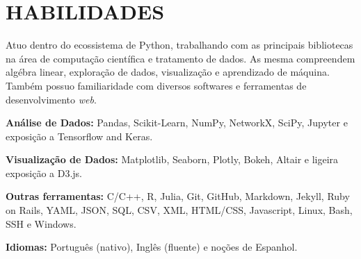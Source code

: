 \documentclass[12pt,a4paper,roman]{moderncv}        %
\begin{document}

\section{HABILIDADES}

\vspace{6pt}
Atuo dentro do ecossistema de Python, trabalhando com as principais bibliotecas na área de computação científica e tratamento de dados. As mesma compreendem algébra linear, exploração de dados, visualização e aprendizado de máquina. Também possuo familiaridade com diversos softwares e ferramentas de desenvolvimento \textit{web}.
\vspace{6pt}

\textbf{Análise de Dados:} Pandas, Scikit-Learn, NumPy, NetworkX, SciPy, Jupyter e exposição a Tensorflow and Keras.

\vspace{6pt}

 \textbf{Visualização de Dados:} Matplotlib, Seaborn, Plotly, Bokeh, Altair e ligeira exposição a D3.js.

\vspace{6pt}

\textbf{Outras ferramentas:} C/C++, R, Julia, Git, GitHub, Markdown, Jekyll, Ruby on Rails, YAML, JSON, SQL, CSV, XML, HTML/CSS,  Javascript, Linux, Bash, SSH e Windows.

\vspace{6pt}

\textbf{Idiomas:} Português (nativo), Inglês (fluente) e noções de Espanhol.
\end{document}

